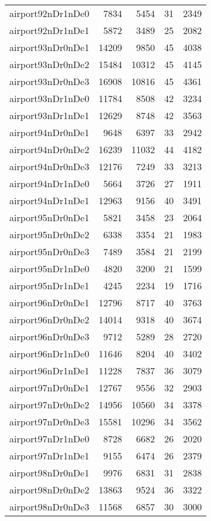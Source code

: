\begin{tabular}{lrrrr}
airport92nDr1nDe0 & 7834 & 5454 & 31 & 2349 \\
airport92nDr1nDe1 & 5872 & 3489 & 25 & 2082 \\
airport93nDr0nDe1 & 14209 & 9850 & 45 & 4038 \\
airport93nDr0nDe2 & 15484 & 10312 & 45 & 4145 \\
airport93nDr0nDe3 & 16908 & 10816 & 45 & 4361 \\
airport93nDr1nDe0 & 11784 & 8508 & 42 & 3234 \\
airport93nDr1nDe1 & 12629 & 8748 & 42 & 3563 \\
airport94nDr0nDe1 & 9648 & 6397 & 33 & 2942 \\
airport94nDr0nDe2 & 16239 & 11032 & 44 & 4182 \\
airport94nDr0nDe3 & 12176 & 7249 & 33 & 3213 \\
airport94nDr1nDe0 & 5664 & 3726 & 27 & 1911 \\
airport94nDr1nDe1 & 12963 & 9156 & 40 & 3491 \\
airport95nDr0nDe1 & 5821 & 3458 & 23 & 2064 \\
airport95nDr0nDe2 & 6338 & 3354 & 21 & 1983 \\
airport95nDr0nDe3 & 7489 & 3584 & 21 & 2199 \\
airport95nDr1nDe0 & 4820 & 3200 & 21 & 1599 \\
airport95nDr1nDe1 & 4245 & 2234 & 19 & 1716 \\
airport96nDr0nDe1 & 12796 & 8717 & 40 & 3763 \\
airport96nDr0nDe2 & 14014 & 9318 & 40 & 3674 \\
airport96nDr0nDe3 & 9712 & 5289 & 28 & 2720 \\
airport96nDr1nDe0 & 11646 & 8204 & 40 & 3402 \\
airport96nDr1nDe1 & 11228 & 7837 & 36 & 3079 \\
airport97nDr0nDe1 & 12767 & 9556 & 32 & 2903 \\
airport97nDr0nDe2 & 14956 & 10560 & 34 & 3378 \\
airport97nDr0nDe3 & 15581 & 10296 & 34 & 3562 \\
airport97nDr1nDe0 & 8728 & 6682 & 26 & 2020 \\
airport97nDr1nDe1 & 9155 & 6474 & 26 & 2379 \\
airport98nDr0nDe1 & 9976 & 6831 & 31 & 2838 \\
airport98nDr0nDe2 & 13863 & 9524 & 36 & 3322 \\
airport98nDr0nDe3 & 11568 & 6857 & 30 & 3000 \\

\end{tabular}
